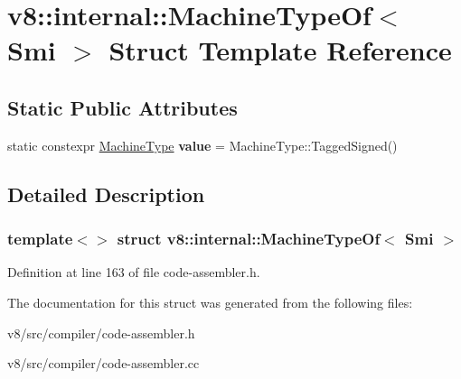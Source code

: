 \hypertarget{structv8_1_1internal_1_1MachineTypeOf_3_01Smi_01_4}{}\section{v8\+:\+:internal\+:\+:Machine\+Type\+Of$<$ Smi $>$ Struct Template Reference}
\label{structv8_1_1internal_1_1MachineTypeOf_3_01Smi_01_4}
\subsection*{Static Public Attributes}
\begin{DoxyCompactItemize}
\item 
\mbox{\label{structv8_1_1internal_1_1MachineTypeOf_3_01Smi_01_4_af5367a3ff3c02c57b23b05291ff6e485}} 
static constexpr \mbox{\hyperlink{classv8_1_1internal_1_1MachineType}{Machine\+Type}} {\bfseries value} = Machine\+Type\+::\+Tagged\+Signed()
\end{DoxyCompactItemize}


\subsection{Detailed Description}
\subsubsection*{template$<$$>$\newline
struct v8\+::internal\+::\+Machine\+Type\+Of$<$ Smi $>$}



Definition at line 163 of file code-\/assembler.\+h.



The documentation for this struct was generated from the following files\+:\begin{DoxyCompactItemize}
\item 
v8/src/compiler/code-\/assembler.\+h\item 
v8/src/compiler/code-\/assembler.\+cc\end{DoxyCompactItemize}
